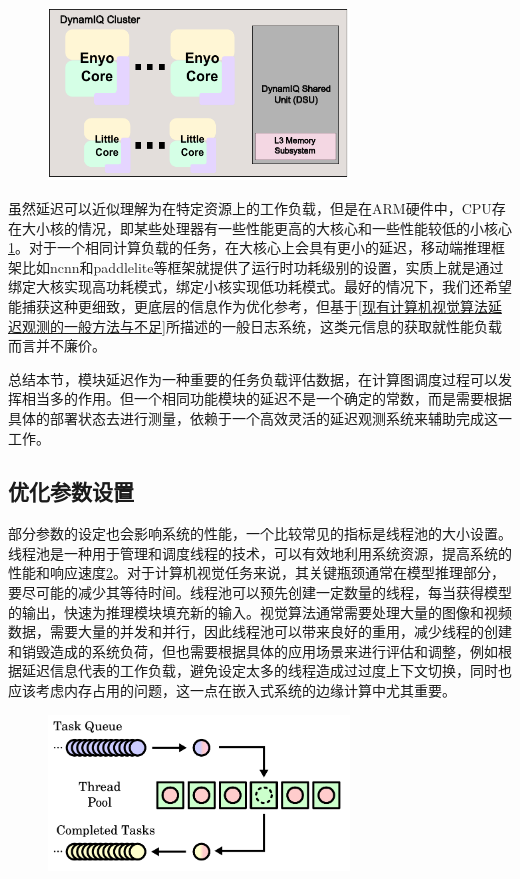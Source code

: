 \documentclass[master]{shtthesis}
\begin{document}
\begin{figure}[H]
	\centering
	\includegraphics[width=8cm]{img/arm.pdf}
	\label{ARM的大小核架构}
\end{figure}

虽然延迟可以近似理解为在特定资源上的工作负载，但是在ARM硬件中，CPU存在大小核的情况，即某些处理器有一些性能更高的大核心和一些性能较低的小核心\ref{ARM的大小核架构}。对于一个相同计算负载的任务，在大核心上会具有更小的延迟，移动端推理框架比如ncnn和paddlelite等框架\cite{febvay2020low}就提供了运行时功耗级别的设置，实质上就是通过绑定大核实现高功耗模式，绑定小核实现低功耗模式。最好的情况下，我们还希望能捕获这种更细致，更底层的信息作为优化参考，但基于\ref{现有计算机视觉算法延迟观测的一般方法与不足}所描述的一般日志系统，这类元信息的获取就性能负载而言并不廉价。

总结本节，模块延迟作为一种重要的任务负载评估数据，在计算图调度过程可以发挥相当多的作用。但一个相同功能模块的延迟不是一个确定的常数，而是需要根据具体的部署状态去进行测量，依赖于一个高效灵活的延迟观测系统来辅助完成这一工作。

\subsection{优化参数设置}\label{优化参数设置}
部分参数的设定也会影响系统的性能，一个比较常见的指标是线程池的大小设置。线程池是一种用于管理和调度线程的技术，可以有效地利用系统资源，提高系统的性能和响应速度\ref{线程池的工作过程}。对于计算机视觉任务来说，其关键瓶颈通常在模型推理部分，要尽可能的减少其等待时间。线程池可以预先创建一定数量的线程，每当获得模型的输出，快速为推理模块填充新的输入。视觉算法通常需要处理大量的图像和视频数据，需要大量的并发和并行，因此线程池可以带来良好的重用，减少线程的创建和销毁造成的系统负荷，但也需要根据具体的应用场景来进行评估和调整，例如根据延迟信息代表的工作负载，避免设定太多的线程造成过过度上下文切换，同时也应该考虑内存占用的问题，这一点在嵌入式系统的边缘计算中尤其重要\cite{threadpool}。

\begin{figure}[htbp]
	\centering
	\includegraphics[width=8cm]{img/thread_pool.pdf}
	\label{线程池的工作过程}
\end{figure}
\end{document}
